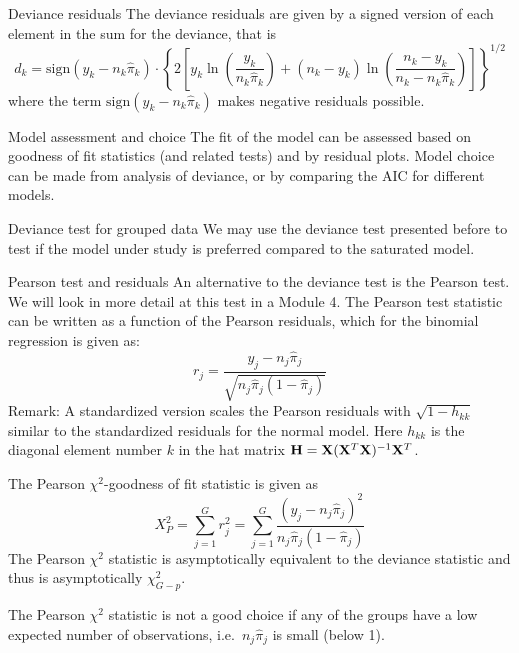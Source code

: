 \documentclass[
  ignorenonframetext,
]{beamer}
\begin{document}
\begin{frame}
\begin{block}{Deviance residuals}
\protect\hypertarget{deviance-residuals}{}
The deviance residuals are given by a signed version of each element in
the sum for the deviance, that is
\[d_k=\text{sign}(y_k-n_k\hat{\pi}_k)\cdot \left\{ 
2[y_k\ln(\frac{y_k}{n_k\hat{\pi}_k})+(n_k-y_k)\ln(\frac{n_k-y_k}{n_k-n_k\hat{\pi}_k})]\right\}^{1/2}\]
where the term \(\text{sign}(y_k-n_k\hat{\pi}_k)\) makes negative
residuals possible.
\end{block}
\end{frame}

\begin{frame}{Model assessment and choice}
\protect\hypertarget{model-assessment-and-choice}{}
The fit of the model can be assessed based on goodness of fit statistics
(and related tests) and by residual plots. Model choice can be made from
analysis of deviance, or by comparing the AIC for different models.

\begin{block}{Deviance test for grouped data}
\protect\hypertarget{deviance-test-for-grouped-data}{}
We may use the deviance test presented before to test if the model under
study is preferred compared to the saturated model.
\end{block}
\end{frame}

\begin{frame}
\begin{block}{Pearson test and residuals}
\protect\hypertarget{pearson-test-and-residuals}{}
An alternative to the deviance test is the Pearson test. We will look in
more detail at this test in a Module 4. The Pearson test statistic can
be written as a function of the Pearson residuals, which for the
binomial regression is given as:
\[ r_{j}=\frac{y_j-n_j\hat{\pi}_j}{\sqrt{n_j \hat{\pi}_j(1-\hat{\pi}_j)}}\]
Remark: A standardized version scales the Pearson residuals with
\(\sqrt{1-h_{kk}}\) similar to the standardized residuals for the normal
model. Here \(h_{kk}\) is the diagonal element number \(k\) in the hat
matrix \({\bf H}={\bf X}({\bf X}^T{\bf X})^{-1}{\bf X}^T\).
\end{block}
\end{frame}

\begin{frame}
The Pearson \(\chi^2\)-goodness of fit statistic is given as
\[ X_P^2=\sum_{j=1}^G r_j^2=\sum_{j=1}^G  \frac{(y_j-n_j\hat{\pi}_j)^2}{n_j \hat{\pi}_j(1-\hat{\pi}_j)}\]
The Pearson \(\chi^2\) statistic is asymptotically equivalent to the
deviance statistic and thus is asymptotically \(\chi^2_{G-p}\).

The Pearson \(\chi^2\) statistic is not a good choice if any of the
groups have a low expected number of observations,
i.e.~\(n_j \hat{\pi}_j\) is small (below 1).
\end{frame}
\end{document}
